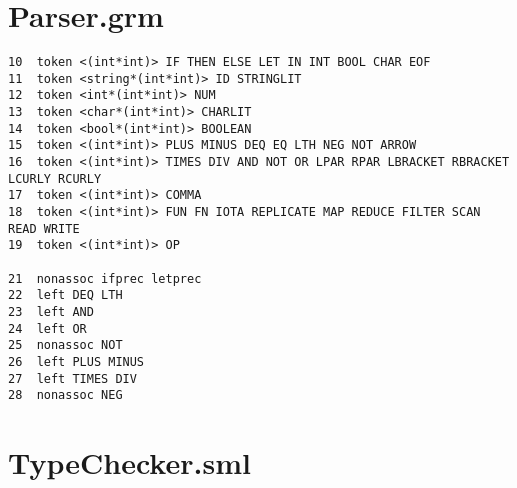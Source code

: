 \documentclass[paper=a4, fontsize=11pt]{scrartcl} %
\numberwithin{equation}{section} %
\numberwithin{figure}{section} %
\numberwithin{table}{section} %
\begin{document}
\pagebreak
\chapter{Parser.grm}
\begin{lstlisting}[mathescape]
10  token <(int*int)> IF THEN ELSE LET IN INT BOOL CHAR EOF
11  token <string*(int*int)> ID STRINGLIT
12  token <int*(int*int)> NUM
13  token <char*(int*int)> CHARLIT
14  token <bool*(int*int)> BOOLEAN
15  token <(int*int)> PLUS MINUS DEQ EQ LTH NEG NOT ARROW
16  token <(int*int)> TIMES DIV AND NOT OR LPAR RPAR LBRACKET RBRACKET LCURLY RCURLY
17  token <(int*int)> COMMA
18  token <(int*int)> FUN FN IOTA REPLICATE MAP REDUCE FILTER SCAN READ WRITE 
19  token <(int*int)> OP

21  nonassoc ifprec letprec
22  left DEQ LTH
23  left AND 
24  left OR
25  nonassoc NOT
26  left PLUS MINUS
27  left TIMES DIV
28  nonassoc NEG

\end{lstlisting}

\pagebreak
\chapter{TypeChecker.sml}
\end{document}
